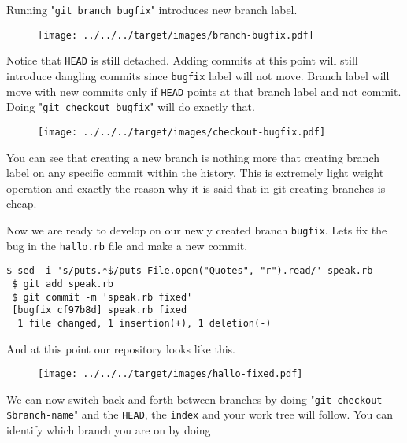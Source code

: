 \documentclass{article}
\theoremstyle{definition}
\begin{document}
        \noindent Running "\texttt{git branch bugfix}" introduces new branch label.

        \begin{figure}[h]
        \centering\texttt{[image: ../../../target/images/branch-bugfix.pdf]}
        \caption{\label{fig:branch-bugfix}}
        \end{figure}

        \noindent Notice that \texttt{HEAD} is still detached. Adding commits at this point will still introduce
        dangling commits since \texttt{bugfix} label will not move. Branch label will move with new commits only
        if \texttt{HEAD} points at that branch label and not commit. Doing "\texttt{git checkout bugfix}" will do
        exactly that.

        \begin{figure}[h]
        \centering\texttt{[image: ../../../target/images/checkout-bugfix.pdf]}
        \caption{\label{fig:checkout-bugfix}}
        \end{figure}

        \noindent You can see that creating a new branch is nothing more that creating branch label on any specific
        commit within the history. This is extremely light weight operation and exactly the reason why it is said that
        in git creating branches is cheap.

        Now we are ready to develop on our newly created branch \texttt{bugfix}. Lets fix the bug in
        the \texttt{hallo.rb} file and make a new commit.
        \newpage
        \begin{Verbatim}[frame=single]
 $ sed -i 's/puts.*$/puts File.open("Quotes", "r").read/' speak.rb
 $ git add speak.rb
 $ git commit -m 'speak.rb fixed'
 [bugfix cf97b8d] speak.rb fixed
  1 file changed, 1 insertion(+), 1 deletion(-)
        \end{Verbatim}
        And at this point our repository looks like this.

        \begin{figure}[h]
        \centering\texttt{[image: ../../../target/images/hallo-fixed.pdf]}
        \caption{\label{fig:hallo-fixed}}
        \end{figure}

        \noindent We can now switch back and forth between branches by doing "\texttt{git checkout \$branch-name}"
        and the \texttt{HEAD}, the \texttt{index} and your work tree will follow. You can identify which branch you
        are on by doing
\end{document}

